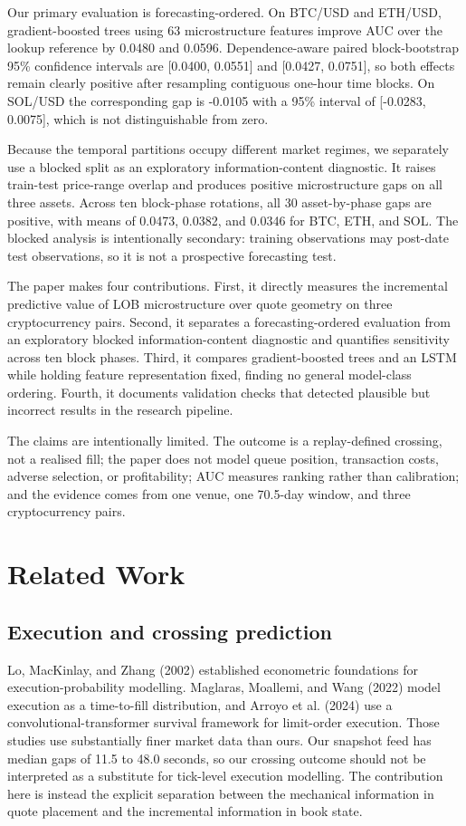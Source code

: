 \documentclass[11pt]{article}
\begin{document}
Our primary evaluation is forecasting-ordered. On BTC/USD and ETH/USD, gradient-boosted trees using 63 microstructure features improve AUC over the lookup reference by 0.0480 and 0.0596. Dependence-aware paired block-bootstrap 95\% confidence intervals are [0.0400, 0.0551] and [0.0427, 0.0751], so both effects remain clearly positive after resampling contiguous one-hour time blocks. On SOL/USD the corresponding gap is -0.0105 with a 95\% interval of [-0.0283, 0.0075], which is not distinguishable from zero.

Because the temporal partitions occupy different market regimes, we separately use a blocked split as an exploratory information-content diagnostic. It raises train-test price-range overlap and produces positive microstructure gaps on all three assets. Across ten block-phase rotations, all 30 asset-by-phase gaps are positive, with means of 0.0473, 0.0382, and 0.0346 for BTC, ETH, and SOL. The blocked analysis is intentionally secondary: training observations may post-date test observations, so it is not a prospective forecasting test.

The paper makes four contributions. First, it directly measures the incremental predictive value of LOB microstructure over quote geometry on three cryptocurrency pairs. Second, it separates a forecasting-ordered evaluation from an exploratory blocked information-content diagnostic and quantifies sensitivity across ten block phases. Third, it compares gradient-boosted trees and an LSTM while holding feature representation fixed, finding no general model-class ordering. Fourth, it documents validation checks that detected plausible but incorrect results in the research pipeline.

The claims are intentionally limited. The outcome is a replay-defined crossing, not a realised fill; the paper does not model queue position, transaction costs, adverse selection, or profitability; AUC measures ranking rather than calibration; and the evidence comes from one venue, one 70.5-day window, and three cryptocurrency pairs.

\section{Related Work}
\subsection{Execution and crossing prediction}
Lo, MacKinlay, and Zhang (2002) established econometric foundations for execution-probability modelling. Maglaras, Moallemi, and Wang (2022) model execution as a time-to-fill distribution, and Arroyo et al. (2024) use a convolutional-transformer survival framework for limit-order execution. Those studies use substantially finer market data than ours. Our snapshot feed has median gaps of 11.5 to 48.0 seconds, so our crossing outcome should not be interpreted as a substitute for tick-level execution modelling. The contribution here is instead the explicit separation between the mechanical information in quote placement and the incremental information in book state.
\end{document}
